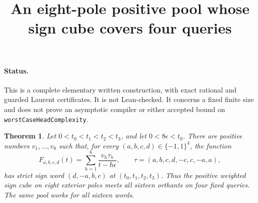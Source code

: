 \documentclass[11pt]{article}
\newtheorem{theorem}{Theorem}
\begin{document}
\title{An eight-pole positive pool whose sign cube covers four queries}
\author{}\date{}\maketitle
\paragraph{Status.}
This is a complete elementary written construction, with exact rational
and guarded Laurent certificates. It is not Lean-checked. It concerns a
fixed finite size and does not prove an asymptotic compiler or either
accepted bound on \texttt{worstCaseHeadComplexity}.

\begin{theorem}
Let $0<t_0<t_1<t_2<t_3$, and let $0<8\epsilon<t_0$.
There are positive numbers $v_1,\ldots,v_8$ such that, for every
$(a,b,c,d)\in\{-1,1\}^4$, the function
\[
 F_{a,b,c,d}(t)=\sum_{h=1}^8\frac{v_h\tau_h}{t-h\epsilon},
 \qquad \tau=(a,b,c,d,-c,c,-a,a),
\]
has strict sign word $(d,-a,b,c)$ at $(t_0,t_1,t_2,t_3)$.
Thus the positive weighted sign cube on eight exterior poles meets
all sixteen orthants on four fixed queries. The same pool works for
all sixteen words.
\end{theorem}
\end{document}
